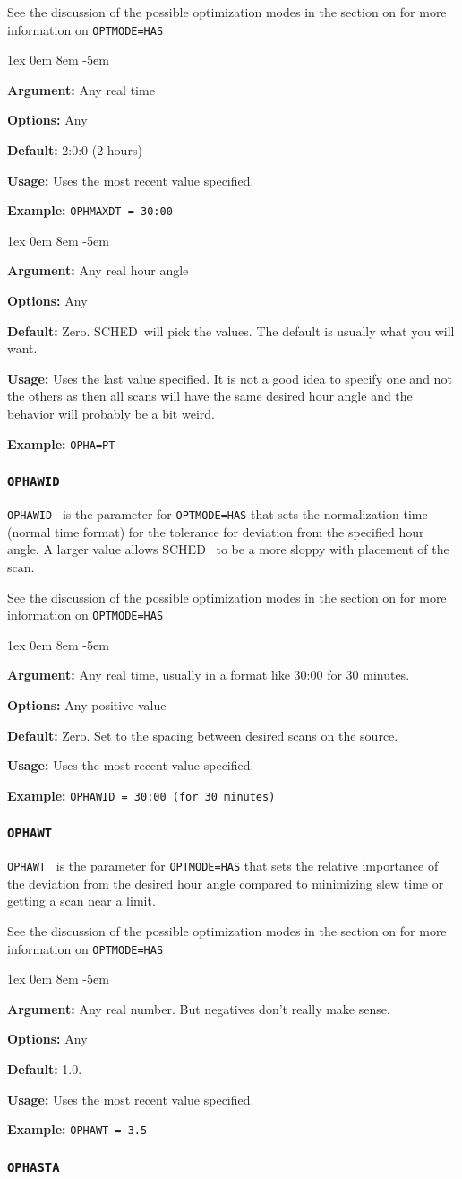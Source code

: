 \documentclass{report}
\newcommand{\schedb}{{\sc SCHED~}}
\newcommand{\rcwbox}[5]{
  \begin{list}{}{\parsep 1ex  \itemsep 0em
                 \leftmargin 8em  \itemindent -5em }
    \item {\bf Argument:} #1
    \item {\bf Options:}  #2
    \item {\bf Default:}  #3
    \item {\bf Usage:}    #4
    \item {\bf Example:}  #5
  \end{list}
}
\begin{document}
See the discussion of the possible optimization modes in the section
on  for more information on
{\tt OPTMODE=HAS}

\rcwbox
{Any real time}
{Any}
{2:0:0 (2 hours)}
{Uses the most recent value specified.}
{{\tt OPHMAXDT = 30:00 }}

\rcwbox
{Any real hour angle}
{Any}
{Zero.  \schedb will pick the values.  The default is usually what you
will want.}
{Uses the last value specified.  It is not a good idea to specify one
and not the others as then all scans will have the same desired hour
angle and the behavior will probably be a bit weird.}
{{\tt OPHA=PT }}

\subsubsection{\label{MP:OPHAWID}{\tt OPHAWID}}

{\tt OPHAWID } is the parameter for {\tt OPTMODE=HAS} that sets the
normalization time (normal time format) for the tolerance for
deviation from the specified hour angle.  A larger value allows \schedb
to be a more sloppy with placement of the scan.

See the discussion of the possible optimization modes in the section
on  for more information on
{\tt OPTMODE=HAS}

\rcwbox
{Any real time, usually in a format like 30:00 for 30 minutes.}
{Any positive value}
{Zero.  Set to the spacing between desired scans on the source.}
{Uses the most recent value specified.}
{{\tt OPHAWID = 30:00 (for 30 minutes)}}

\subsubsection{\label{MP:OPHAWT}{\tt OPHAWT}}

{\tt OPHAWT } is the parameter for {\tt OPTMODE=HAS} that sets the
relative importance of the deviation from the desired hour angle
compared to minimizing slew time or getting a scan near a limit.

See the discussion of the possible optimization modes in the section
on  for more information on
{\tt OPTMODE=HAS}

\rcwbox
{Any real number.  But negatives don't really make sense.}
{Any}
{1.0.}
{Uses the most recent value specified.}
{{\tt OPHAWT = 3.5}}

\subsubsection{\label{MP:OPHASTA}{\tt OPHASTA}}
\end{document}
